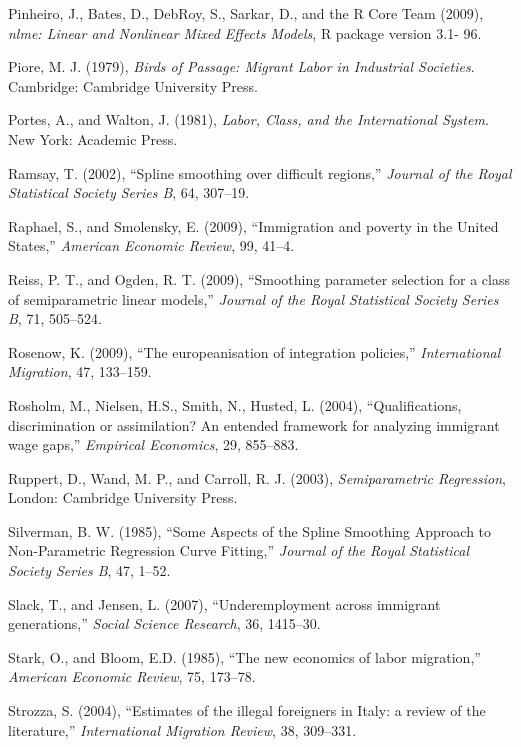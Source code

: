 \documentclass[10pt]{article}
\theoremstyle{definition}
\theoremstyle{plain}
\begin{document}
\begin{thebibliography}{99}
\bibitem{} Pinheiro, J., Bates, D., DebRoy, S., Sarkar, D., and the R Core Team (2009), \textit{nlme: Linear and Nonlinear Mixed Effects Models}, R package version 3.1- 96.

\bibitem{} Piore, M. J. (1979), \textit{Birds of Passage: Migrant Labor in Industrial Societies}. Cambridge: Cambridge University Press.

\bibitem{} Portes, A., and Walton, J. (1981), \textit{Labor, Class, and the International System}. New York: Academic Press.

\bibitem{} Ramsay, T. (2002), ``Spline smoothing over difficult regions,'' \textit{Journal of the Royal Statistical Society Series B}, 64, 307--19.

\bibitem{} Raphael, S., and Smolensky, E. (2009), ``Immigration and poverty in the United States,'' \textit{American Economic Review}, 99, 41--4.

\bibitem{} Reiss, P. T., and Ogden, R. T. (2009), ``Smoothing parameter selection for a class of semiparametric linear models,'' \textit{Journal of the Royal Statistical Society Series B}, 71, 505--524.

\bibitem{} Rosenow, K. (2009), ``The europeanisation of integration policies,'' \textit{International Migration}, 47, 133--159.

\bibitem{} Rosholm, M., Nielsen, H.S., Smith, N., Husted, L. (2004), ``Qualifications, discrimination or assimilation? An entended framework for analyzing immigrant wage gaps,'' \textit{Empirical Economics}, 29, 855--883.

\bibitem{} Ruppert, D., Wand, M. P., and Carroll, R. J. (2003), \textit{Semiparametric Regression}, London: Cambridge University Press.

\bibitem{} Silverman, B. W. (1985), ``Some Aspects of the Spline Smoothing Approach to Non-Parametric Regression Curve Fitting,'' \textit{Journal of the Royal Statistical Society Series B}, 47, 1--52.

\bibitem{} Slack, T., and Jensen, L. (2007), ``Underemployment across immigrant generations,'' \textit{Social Science Research}, 36, 1415--30.

\bibitem{} Stark, O., and Bloom, E.D. (1985), ``The new economics of labor migration,'' \textit{American Economic Review}, 75, 173--78.

\bibitem{} Strozza, S. (2004), ``Estimates of the illegal foreigners in Italy: a review of the literature,'' \textit{International Migration Review}, 38, 309--331.



\end{thebibliography}
\end{document}
